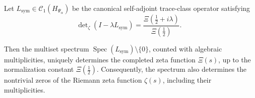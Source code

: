 \begin{corollary}
\label{cor:spectrum_determines_zeta}
Let \( L_{\mathrm{sym}} \in \mathcal{C}_1(H_{\Psi_\alpha}) \) be the canonical self-adjoint trace-class operator satisfying
\[
\det\nolimits_\zeta(I - \lambda L_{\mathrm{sym}}) = \frac{\Xi(\tfrac{1}{2} + i\lambda)}{\Xi(\tfrac{1}{2})}.
\]

Then the multiset spectrum \( \operatorname{Spec}(L_{\mathrm{sym}}) \setminus \{0\} \), counted with algebraic multiplicities, uniquely determines the completed zeta function \( \Xi(s) \), up to the normalization constant \( \Xi(\tfrac{1}{2}) \). Consequently, the spectrum also determines the nontrivial zeros of the Riemann zeta function \( \zeta(s) \), including their multiplicities.
\end{corollary}
